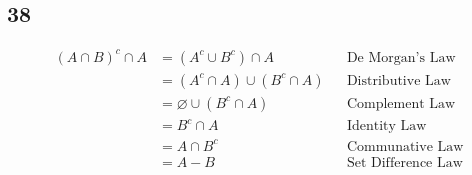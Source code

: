 \documentclass[12pt]{article}
\begin{document}
\subsection*{38}
\begin{align*}
  (A \cap B)^c \cap A &= (A^c \cup B^c) \cap A && \text{De Morgan's Law} \\
  &= (A^c \cap A) \cup (B^c \cap A) && \text{Distributive Law} \\
  &= \varnothing \cup (B^c \cap A) && \text{Complement Law} \\
  &= B^c \cap A && \text{Identity Law} \\
  &= A \cap B^c && \text{Communative Law} \\
  &= A - B && \text{Set Difference Law} \\
\end{align*}
\end{document}
